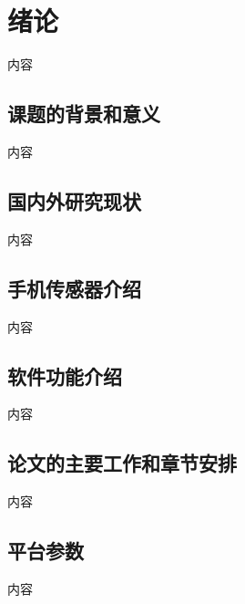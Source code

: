 \section{绪论}
        内容
        \subsection{课题的背景和意义}
            内容 \cite{gostout1992clinical}
        \subsection{国内外研究现状}
            内容
        \subsection{手机传感器介绍}
            内容 \cite{rivero2001resistance}
        \subsection{软件功能介绍}
            内容
        \subsection{论文的主要工作和章节安排}
            内容
        \subsection{平台参数}
            内容